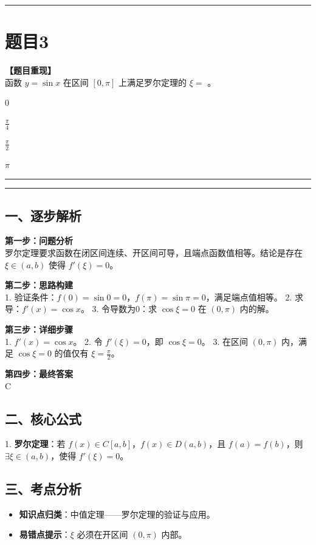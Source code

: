 \documentclass[12pt, a4paper]{ctexart}
\newcommand{\TopSeparator}{
    \par\noindent\rule{\textwidth}{1.5pt}\vspace{0.5em} %
}
\newcommand{\AnalysisSeparator}{
    \par\noindent\rule{\textwidth}{0.5pt}\vspace{0.2em}\hrule\vspace{0.5em} %
}
\newenvironment{RedAnalysis}{
    \par
    \color{red} %
}{
    \par
    \color{black} %
}
\newcommand{\choicesFour}[4]{
    \begin{enumerate}[label=\Alph*., itemsep=0pt, parsep=0pt, topsep=5pt, labelsep=0.5em]
        \begin{minipage}{0.22\linewidth} \item #1 \end{minipage}
        \begin{minipage}{0.22\linewidth} \item #2 \end{minipage}
        \begin{minipage}{0.22\linewidth} \item #3 \end{minipage}
        \begin{minipage}{0.22\linewidth} \item #4 \end{minipage}
    \end{enumerate}
}
\begin{document}
\vspace{2em}

\TopSeparator
\section*{题目3}

\textbf{【题目重现】} \\
函数 $ y = \sin x $ 在区间 $ [0, \pi] $ 上满足罗尔定理的 $ \xi = $ \underline{\hspace{1cm}}。
\choicesFour{0}{$ \frac{\pi}{4} $}{$ \frac{\pi}{2} $}{$ \pi $}

\AnalysisSeparator

\begin{RedAnalysis}

\subsection*{一、逐步解析}

\textbf{第一步：问题分析} \\
罗尔定理要求函数在闭区间连续、开区间可导，且端点函数值相等。结论是存在 $\xi \in (a, b)$ 使得 $f'(\xi) = 0$。

\textbf{第二步：思路构建} \\
1. 验证条件：$f(0) = \sin 0 = 0$，$f(\pi) = \sin \pi = 0$，满足端点值相等。
2. 求导：$f'(x) = \cos x$。
3. 令导数为0：求 $\cos \xi = 0$ 在 $(0, \pi)$ 内的解。

\textbf{第三步：详细步骤} \\
1. $f'(x) = \cos x$。
2. 令 $f'(\xi) = 0$，即 $\cos \xi = 0$。
3. 在区间 $(0, \pi)$ 内，满足 $\cos \xi = 0$ 的值仅有 $\xi = \frac{\pi}{2}$。

\textbf{第四步：最终答案} \\
C

\subsection*{二、核心公式}
1. \textbf{罗尔定理}：若 $f(x) \in C[a,b]$，$f(x) \in D(a,b)$，且 $f(a)=f(b)$，则 $\exists \xi \in (a,b)$，使得 $f'(\xi)=0$。

\subsection*{三、考点分析}
\begin{itemize}
    \item \textbf{知识点归类}：中值定理——罗尔定理的验证与应用。
    \item \textbf{易错点提示}：$\xi$ 必须在开区间 $(0, \pi)$ 内部。
\end{itemize}

\end{RedAnalysis}
\end{document}
